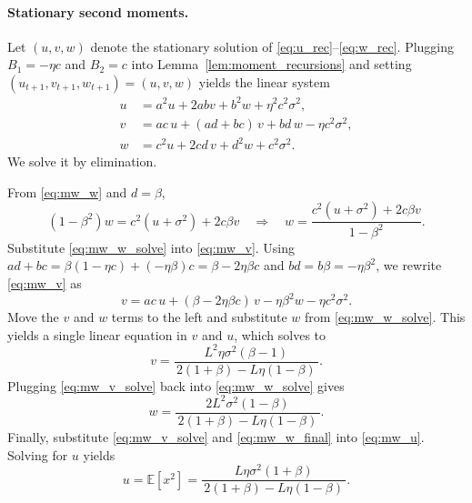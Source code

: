\documentclass[11pt, a4paper, onecolumn, copyright, goog]{google}
\newcommand{\E}{\mathbb{E}}
\theoremstyle{plain}
\theoremstyle{definition}
\theoremstyle{remark}
\begin{document}
\paragraph{Stationary second moments.}
Let $(u,v,w)$ denote the stationary solution of \eqref{eq:u_rec}--\eqref{eq:w_rec}. Plugging $B_1=-\eta c$ and $B_2=c$
into Lemma~\ref{lem:moment_recursions} and setting $(u_{t+1},v_{t+1},w_{t+1})=(u,v,w)$ yields the linear system
\begin{align}
    u &= a^2 u + 2ab v + b^2 w + \eta^2 c^2\sigma^2, \label{eq:mw_u}\\
    v &= ac\,u + (ad+bc)\,v + bd\,w - \eta c^2\sigma^2, \label{eq:mw_v}\\
    w &= c^2 u + 2cd\,v + d^2 w + c^2\sigma^2. \label{eq:mw_w}
\end{align}
We solve it by elimination.

From \eqref{eq:mw_w} and $d=\beta$,
\begin{equation}
\label{eq:mw_w_solve}
    (1-\beta^2)w = c^2(u+\sigma^2) + 2c\beta v
    \quad\Longrightarrow\quad
    w=\frac{c^2(u+\sigma^2)+2c\beta v}{1-\beta^2}.
\end{equation}
Substitute \eqref{eq:mw_w_solve} into \eqref{eq:mw_v}. Using $ad+bc=\beta(1-\eta c) + (-\eta\beta)c = \beta - 2\eta\beta c$
and $bd=b\beta=-\eta\beta^2$, we rewrite \eqref{eq:mw_v} as
\begin{equation}
\label{eq:mw_v_mid}
    v = ac\,u + (\beta-2\eta\beta c)\,v - \eta\beta^2 w - \eta c^2\sigma^2.
\end{equation}
Move the $v$ and $w$ terms to the left and substitute $w$ from \eqref{eq:mw_w_solve}. This yields a single linear equation
in $v$ and $u$, which solves to
\begin{equation}
\label{eq:mw_v_solve}
    v = \frac{L^2\eta\sigma^2(\beta-1)}{\,2(1+\beta)-L\eta(1-\beta)\,}.
\end{equation}
Plugging \eqref{eq:mw_v_solve} back into \eqref{eq:mw_w_solve} gives
\begin{equation}
\label{eq:mw_w_final}
    w = \frac{2L^2\sigma^2(1-\beta)}{\,2(1+\beta)-L\eta(1-\beta)\,}.
\end{equation}
Finally, substitute \eqref{eq:mw_v_solve} and \eqref{eq:mw_w_final} into \eqref{eq:mw_u}. Solving for $u$ yields
\begin{equation}
\label{eq:mw_u_final}
    u = \E[x^2]
    = \frac{L\eta\sigma^2(1+\beta)}{\,2(1+\beta)-L\eta(1-\beta)\,}.
\end{equation}
\end{document}
